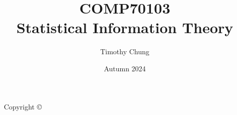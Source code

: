 \documentclass[a4paper,nofonts,notoc,oneside,openany,nobib]{tufte-book}
\title{COMP70103 \\Statistical Information Theory}
\date{Autumn 2024}
\author[Timothy Chung]{Timothy Chung}
\newcommand{\monthyear}{%
  \ifcase\month\or January\or February\or March\or April\or May\or June\or
  July\or August\or September\or October\or November\or
  December\fi\space\number\year
}
\newcommand{\openepigraph}[2]{%
  \begin{fullwidth}
  \sffamily\large
  \begin{doublespace}
  \noindent\allcaps{#1}\\%
  \noindent\allcaps{#2}%
  \end{doublespace}
  \end{fullwidth}
}
\newcommand{\blankpage}{\newpage\hbox{}\thispagestyle{empty}\newpage}
\begin{document}
\frontmatter
\RaggedRight




\begin{fullwidth}
  \begin{raggedright}
    \maketitle
  \end{raggedright}
\end{fullwidth}


\newpage
\begin{fullwidth}
  ~\vfill
  \thispagestyle{empty}
  \setlength{\parindent}{0pt}
  \setlength{\parskip}{\baselineskip}
  Copyright \copyright\ \the\year\ \thanklessauthor




\end{fullwidth}
\end{document}
